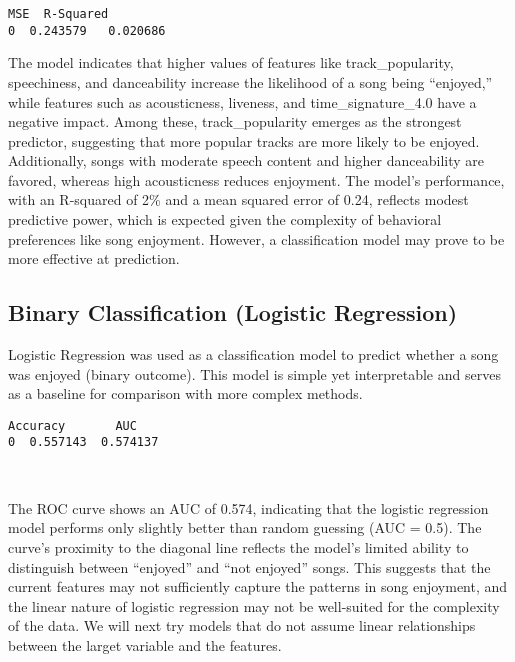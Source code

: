 \documentclass[11pt]{article}
\begin{document}
    
    
    \begin{Verbatim}[commandchars=\\\{\}]
        MSE  R-Squared
0  0.243579   0.020686
    \end{Verbatim}

    
    The model indicates that higher values of features like
track\_popularity, speechiness, and danceability increase the likelihood
of a song being ``enjoyed,'' while features such as acousticness,
liveness, and time\_signature\_4.0 have a negative impact. Among these,
track\_popularity emerges as the strongest predictor, suggesting that
more popular tracks are more likely to be enjoyed. Additionally, songs
with moderate speech content and higher danceability are favored,
whereas high acousticness reduces enjoyment. The model's performance,
with an R-squared of 2\% and a mean squared error of 0.24, reflects
modest predictive power, which is expected given the complexity of
behavioral preferences like song enjoyment. However, a classification
model may prove to be more effective at prediction.

    \subsection{Binary Classification (Logistic
Regression)}\label{binary-classification-logistic-regression}

Logistic Regression was used as a classification model to predict
whether a song was enjoyed (binary outcome). This model is simple yet
interpretable and serves as a baseline for comparison with more complex
methods.

    
    \begin{Verbatim}[commandchars=\\\{\}]
   Accuracy       AUC
0  0.557143  0.574137
    \end{Verbatim}

    
    \begin{center}
    \end{center}
    { \hspace*{\fill} \\}
    
    The ROC curve shows an AUC of 0.574, indicating that the logistic
regression model performs only slightly better than random guessing (AUC
= 0.5). The curve's proximity to the diagonal line reflects the model's
limited ability to distinguish between ``enjoyed'' and ``not enjoyed''
songs. This suggests that the current features may not sufficiently
capture the patterns in song enjoyment, and the linear nature of
logistic regression may not be well-suited for the complexity of the
data. We will next try models that do not assume linear relationships
between the larget variable and the features.
\end{document}
